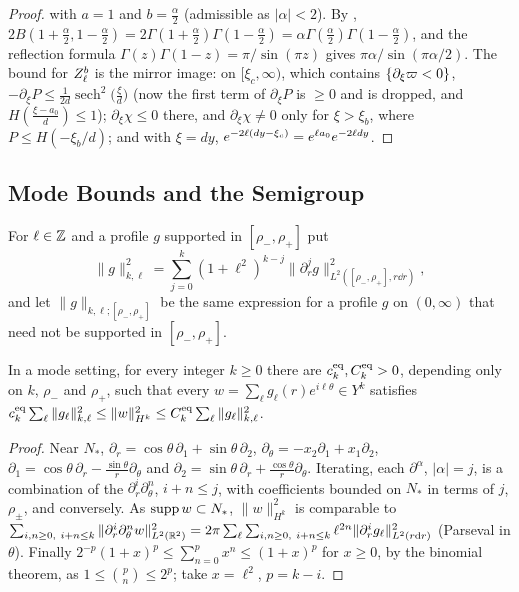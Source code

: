 \begin{proof}
\cite[\href{https://dlmf.nist.gov/5.12.E7}{(5.12.7)}]{DLMF} with $a=1$ and
$b=\frac\alpha2$ (admissible as $|\alpha|<2$). By
\cite[\href{https://dlmf.nist.gov/5.12.E1}{(5.12.1)}]{DLMF},
$2B(1+\frac\alpha2,1-\frac\alpha2)=2\Gamma(1+\frac\alpha2)\Gamma(1-\frac\alpha2)
=\alpha\Gamma(\frac\alpha2)\Gamma(1-\frac\alpha2)$, and the reflection formula
$\Gamma(z)\Gamma(1-z)=\pi/\sin(\pi z)$
\cite[\href{https://dlmf.nist.gov/5.5.E3}{(5.5.3)}]{DLMF} gives $\pi\alpha/\sin(\pi\alpha/2)$. The bound for $Z^b_\ell$ is the mirror
image: on $[\xi_c,\infty)$, which contains $\{\partial_\xi\varpi<0\}$,
$-\partial_\xi P\le\frac1{2d}\operatorname{sech}^2\big(\frac\xi d\big)$ (now the first term
of $\partial_\xi P$ is $\ge0$ and is dropped, and $H(\frac{\xi-a_0}d)\le1$);
$\partial_\xi\chi\le0$ there, and $\partial_\xi\chi\ne0$ only for $\xi>\xi_b$, where
$P\le H(-\xi_b/d)$; and with $\xi=dy$,
$e^{-2\ell(dy-\xi_c)}=\nobreak e^{\ell a_0}e^{-2\ell dy}$.
\end{proof}

\subsection{Mode Bounds and the Semigroup}

For $\ell\in\mathbb{Z}$ and a profile $g$ supported in $[\rho_-,\rho_+]$ put
\[
\|g\|_{k,\ell}^2=\sum_{j=0}^{k}(1+\ell^2)^{k-j}\|\partial_r^jg\|^2_{L^2([\rho_-,\rho_+],r\dd r)},
\]
and let $\|g\|_{k,\ell;[\rho_-,\rho_+]}$ be the same expression for a profile $g$
on $(0,\infty)$ that need not be supported in $[\rho_-,\rho_+]$.

\begin{lemma}
\label{lem:norm-equiv}
In a mode setting, for every integer $k\ge0$ there are $c^{\rm eq}_k,C^{\rm eq}_k>0$, depending
only on $k$, $\rho_-$ and $\rho_+$, such that every
$w=\sum_\ell g_\ell(r)e^{i\ell\theta}\in Y^k$ satisfies
$c^{\rm eq}_k\sum_\ell\|g_\ell\|^2_{k,\ell}\le\|w\|^2_{H^k}\le C^{\rm eq}_k\sum_\ell\|g_\ell\|^2_{k,\ell}$.
\end{lemma}
\begin{proof}
Near $N_*$, $\partial_r=\cos\theta\,\partial_1+\sin\theta\,\partial_2$,
$\partial_\theta=-x_2\partial_1+x_1\partial_2$,
$\partial_1=\cos\theta\,\partial_r-\frac{\sin\theta}r\partial_\theta$ and
$\partial_2=\sin\theta\,\partial_r+\frac{\cos\theta}r\partial_\theta$. Iterating, each
$\partial^\alpha$, $|\alpha|=j$, is a combination of the
$\partial_r^i\partial_\theta^n$, $i+n\le j$, with coefficients bounded on $N_*$ in
terms of $j$, $\rho_\pm$, and conversely. As $\operatorname{supp} w\subset N_*$, $\|w\|_{H^k}^2$ is
comparable to $\sum_{i,n\ge0,\ i+n\le k}\|\partial_r^i\partial_\theta^nw\|^2_{L^2(\mathbb{R}^2)}
=2\pi\sum_\ell\sum_{i,n\ge0,\ i+n\le k}\ell^{2n}\|\partial_r^ig_\ell\|^2_{L^2(r\dd r)}$ (Parseval in
$\theta$). Finally $2^{-p}(1+x)^p\le\sum_{n=0}^{p}x^n\le(1+x)^p$ for $x\ge0$, by the binomial
theorem, as $1\le\binom pn\le2^p$; take
$x=\ell^2$, $p=k-i$.
\end{proof}

